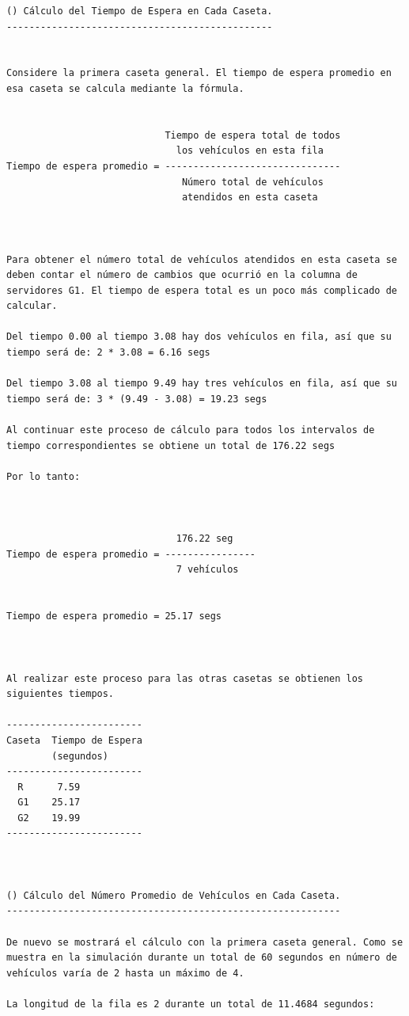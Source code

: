\begin{verbatim}
() Cálculo del Tiempo de Espera en Cada Caseta.
-----------------------------------------------


Considere la primera caseta general. El tiempo de espera promedio en esa caseta se calcula mediante la fórmula.


                            Tiempo de espera total de todos
                              los vehículos en esta fila
Tiempo de espera promedio = -------------------------------
                               Número total de vehículos
                               atendidos en esta caseta



Para obtener el número total de vehículos atendidos en esta caseta se deben contar el número de cambios que ocurrió en la columna de servidores G1. El tiempo de espera total es un poco más complicado de calcular. 

Del tiempo 0.00 al tiempo 3.08 hay dos vehículos en fila, así que su tiempo será de: 2 * 3.08 = 6.16 segs

Del tiempo 3.08 al tiempo 9.49 hay tres vehículos en fila, así que su tiempo será de: 3 * (9.49 - 3.08) = 19.23 segs

Al continuar este proceso de cálculo para todos los intervalos de tiempo correspondientes se obtiene un total de 176.22 segs

Por lo tanto:


                              
                              176.22 seg
Tiempo de espera promedio = ----------------
                              7 vehículos


Tiempo de espera promedio = 25.17 segs



Al realizar este proceso para las otras casetas se obtienen los siguientes tiempos.

------------------------
Caseta  Tiempo de Espera
        (segundos)
------------------------
  R      7.59
  G1    25.17
  G2    19.99
------------------------



() Cálculo del Número Promedio de Vehículos en Cada Caseta.
-----------------------------------------------------------

De nuevo se mostrará el cálculo con la primera caseta general. Como se muestra en la simulación durante un total de 60 segundos en número de vehículos varía de 2 hasta un máximo de 4.

La longitud de la fila es 2 durante un total de 11.4684 segundos:


\end{verbatim}
